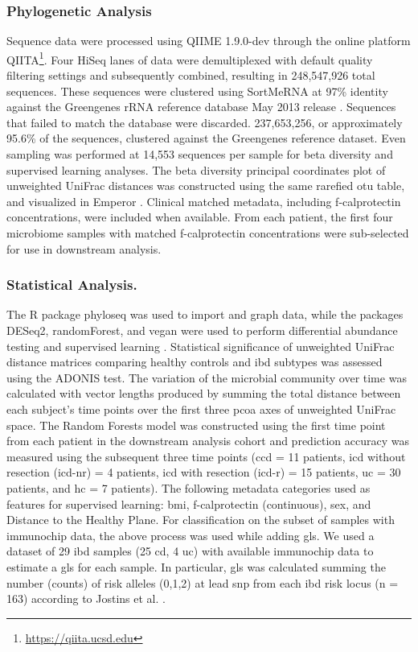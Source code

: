 \subsubsection{Phylogenetic Analysis}

Sequence data were processed using QIIME 1.9.0-dev through the online platform QIITA\footnote{\url{https://qiita.ucsd.edu}}\cite{RN110}. Four HiSeq lanes of data were demultiplexed with default quality filtering settings and subsequently combined, resulting in 248,547,926 total sequences. These sequences were clustered using SortMeRNA at 97\% identity against the Greengenes rRNA reference database May 2013 release \cite{Kopylova2012,McDonald2012}. Sequences that failed to match the database were discarded. 237,653,256, or approximately 95.6\% of the sequences, clustered against the Greengenes reference dataset. Even sampling was performed at 14,553 sequences per sample for beta diversity and supervised learning analyses. The beta diversity principal coordinates plot of unweighted UniFrac distances was constructed using the same rarefied \gls{otu} table, and visualized in Emperor \cite{Lozupone2005,Vazquez2013}. Clinical matched metadata, including f-calprotectin concentrations, were included when available. From each patient, the first four microbiome samples with matched f-calprotectin concentrations were sub-selected for use in downstream analysis. 

\subsubsection{Statistical Analysis.}

The R package phyloseq was used to import and graph data, while the packages DESeq2, randomForest, and vegan were used to perform differential abundance testing and supervised learning \cite{Ihaka1996,Liaw2002,Love2014,McMurdie2013,Oksanen2016}. Statistical significance of unweighted UniFrac distance matrices comparing healthy controls and \gls{ibd} subtypes was assessed using the ADONIS test. The variation of the microbial community over time was calculated with vector lengths produced by summing the total distance between each subject's time points over the first three \gls{pcoa} axes of unweighted UniFrac space. The Random Forests model was constructed using the first time point from each patient in the downstream analysis cohort and prediction accuracy was measured using the subsequent three time points  (\gls{ccd} = 11 patients, \gls{icd} without resection (\gls{icd}-nr) = 4 patients, \gls{icd} with resection (\gls{icd}-r) = 15 patients, \gls{uc} = 30 patients, and \gls{hc} = 7 patients). The following metadata categories used as features for supervised learning: \gls{bmi}, f-calprotectin (continuous), sex, and Distance to the Healthy Plane. For classification on the subset of samples with immunochip data, the above process was used while adding \gls{gls}. We used a dataset of 29 \gls{ibd} samples (25 \gls{cd}, 4 \gls{uc}) with available immunochip data to estimate a \gls{gls} for each sample. In particular, \gls{gls} was calculated summing the number (counts) of risk alleles (0,1,2) at lead \gls{snp} from each \gls{ibd} risk locus (n = 163) according to Jostins et al. \cite{Jostins2012}.

